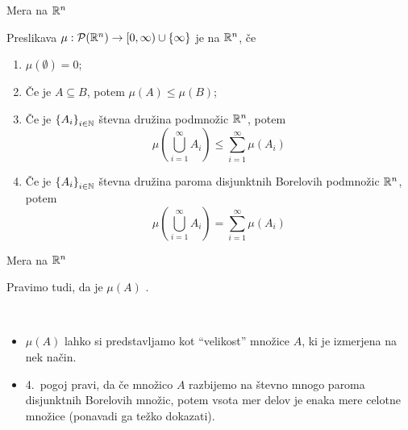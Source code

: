 \documentclass[10pt]{beamer}
\begin{document}
\begin{frame}{Mera na \(\mathbb{R}^n\)}
    \begin{definicija}
        Preslikava \(\mu: \mathcal{P}(\mathbb{R}^n) \to [0, \infty) \cup \left\{\infty\right\}\) je  na \(\mathbb{R}^n\), če 
        \begin{enumerate}
            \item \(\mu(\emptyset) = 0\);
            \item Če je \(A \subseteq B\), potem \(\mu(A) \leq \mu(B)\);
            \item Če je \(\left\{A_i\right\}_{i \in \mathbb{N}}\) števna družina podmnožic \(\mathbb{R}^n\), potem 
            \[\mu\left(\bigcup_{i=1}^\infty A_i\right) \leq \sum_{i=1}^{\infty} \mu (A_i)\]
            \item Če je \(\left\{A_i\right\}_{i \in \mathbb{N}}\) števna družina paroma disjunktnih Borelovih podmnožic \(\mathbb{R}^n\), potem 
            \[\mu\left(\bigcup_{i=1}^\infty A_i\right) = \sum_{i=1}^{\infty} \mu (A_i)\]
        \end{enumerate}
    \end{definicija}
\end{frame}

\begin{frame}{Mera na \(\mathbb{R}^n\)}
    \begin{definicija}
            Pravimo tudi, da je \(\mu(A)\) .
    \end{definicija}

    \begin{opomba} \
        \begin{itemize}
            \item \(\mu(A)\) lahko si predstavljamo kot "`velikost"' množice \(A\), ki je izmerjena na nek način.
            \item 4.\ pogoj pravi, da če množico \(A\) razbijemo na števno mnogo paroma disjunktnih Borelovih množic, potem vsota mer delov je enaka mere celotne množice (ponavadi ga težko dokazati).
        \end{itemize}
    \end{opomba}
\end{frame}
\end{document}
